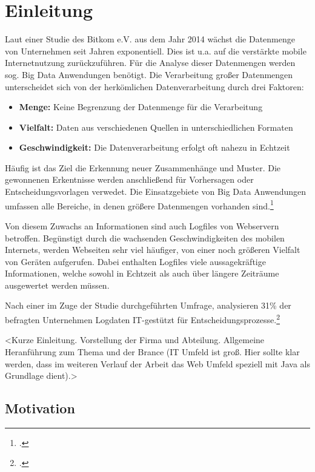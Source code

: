 
\chapter{Einleitung}\label{cha:Einleitung}
Laut einer Studie des Bitkom e.V. aus dem Jahr 2014 wächst die Datenmenge von Unternehmen seit Jahren exponentiell. Dies ist u.a. auf die verstärkte mobile Internetnutzung zurückzuführen. Für die Analyse dieser Datenmengen werden sog. Big Data Anwendungen benötigt. Die Verarbeitung großer Datenmengen unterscheidet sich von der herkömlichen Datenverarbeitung durch drei Faktoren:

\begin{itemize}
	\item \textbf{Menge:} Keine Begrenzung der Datenmenge für die Verarbeitung
	\item \textbf{Vielfalt:} Daten aus verschiedenen Quellen in unterschiedlichen Formaten
	\item \textbf{Geschwindigkeit:} Die Datenverarbeitung erfolgt oft nahezu in Echtzeit
\end{itemize}

Häufig ist das Ziel die Erkennung neuer Zusammenhänge und Muster. Die gewonnenen Erkentnisse werden anschließend für Vorhersagen oder Entscheidungsvorlagen verwedet. Die Einsatzgebiete von Big Data Anwendungen umfassen alle Bereiche, in denen größere Datenmengen vorhanden sind.\footcite[Vgl.][S. 3]{Bitkom.2014}

Von diesem Zuwachs an Informationen sind auch Logfiles von Webservern betroffen. Begünstigt durch die wachsenden Geschwindigkeiten des mobilen Internets, werden Webseiten sehr viel häufiger, von einer noch größeren Vielfalt von Geräten aufgerufen. Dabei enthalten Logfiles viele aussagekräftige Informationen, welche sowohl in Echtzeit als auch über längere Zeiträume ausgewertet werden müssen.

Nach einer im Zuge der Studie durchgeführten Umfrage, analysieren 31\% der befragten Unternehmen Logdaten IT-gestützt für Entscheidungsprozesse.\footcite[Vgl.][S. 8]{Bitkom.2014}



<Kurze Einleitung. Vorstellung der Firma und Abteilung. Allgemeine Heranführung zum Thema und der Brance (IT Umfeld ist groß. Hier sollte klar werden, dass im weiteren Verlauf der Arbeit das Web Umfeld speziell mit Java als Grundlage dient).>

\section{Motivation}\label{sec:Motivation}


